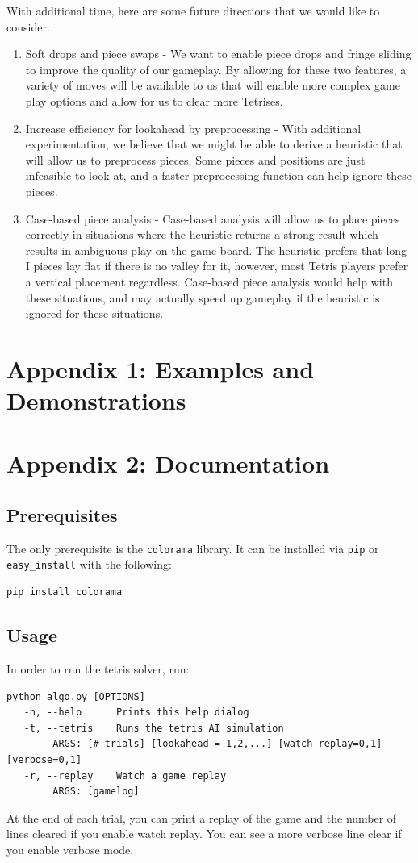 \documentclass[12pt]{article}
\begin{document}
With additional time, here are some future directions that we would like to consider.
\begin{enumerate}
\item Soft drops and piece swaps - We want to enable piece drops and fringe sliding to improve the quality of our gameplay. By allowing for these two features, a variety of moves will be available to us that will enable more complex game play options and allow for us to clear more Tetrises.
\item Increase efficiency for lookahead by preprocessing - With additional experimentation, we believe that we might be able to derive a heuristic that will allow us to preprocess pieces. Some pieces and positions are just infeasible to look at, and a faster preprocessing function can help ignore these pieces.
\item Case-based piece analysis - Case-based analysis will allow us to place pieces correctly in situations where the heuristic returns a strong result which results in ambiguous play on the game board. The heuristic prefers that long I pieces lay flat if there is no valley for it, however, most Tetris players prefer a vertical placement regardless. Case-based piece analysis would help with these situations, and may actually speed up gameplay if the heuristic is ignored for these situations.
\end{enumerate}

\section{Appendix 1: Examples and Demonstrations}

\section{Appendix 2: Documentation}
\subsection{Prerequisites}
The only prerequisite is the \verb|colorama| library. It can be installed via \verb|pip| or \verb|easy_install| with the following:
\begin{verbatim}
pip install colorama
\end{verbatim}

\subsection{Usage}
In order to run the tetris solver, run:
\begin{verbatim}
python algo.py [OPTIONS]
   -h, --help      Prints this help dialog
   -t, --tetris    Runs the tetris AI simulation
        ARGS: [# trials] [lookahead = 1,2,...] [watch replay=0,1] [verbose=0,1]
   -r, --replay    Watch a game replay
        ARGS: [gamelog]
\end{verbatim}
At the end of each trial, you can print a replay of the game and the number of lines cleared if you enable watch replay. You can see a more verbose line clear if you enable verbose mode.
\end{document}
